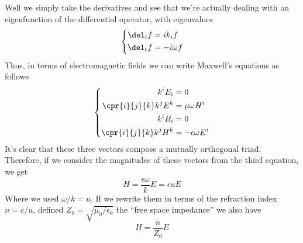 \documentclass[../electromagnetism.tex]{subfiles}
\begin{document}
Well we simply take the derivatives and see that we're actually dealing with an eigenfunction of the differential operator, with eigenvalues
\begin{equation}
	\left\{ \begin{aligned}
		\del_if&= ik_if\\
		\del_tf&= -i\omega f
\end{aligned}\right.
	\label{eq:eigenwave}
\end{equation}
Thus, in terms of electromagnetic fields we can write Maxwell's equations as follows
\begin{equation}
	\left\{ \begin{aligned}
			k^iE_i&= 0\\
			\cpr{i}{j}{k}k^jE^k&= \mu\omega H^i\\
			k^iB_i&= 0\\
			\cpr{i}{j}{k}k^jH^k&= -\epsilon\omega E^i
	\end{aligned}\right.
	\label{eq:eigenmaxwell}
\end{equation}
It's clear that these three vectors compose a mutually orthogonal triad. Therefore, if we consider the magnitudes of these vectors from the third equation, we get
\begin{equation}
	H=\frac{\epsilon\omega}{k}E=\epsilon uE
	\label{eq:HErelwaves}
\end{equation}
Where we used $\omega/k=u$. If we rewrite them in terms of the refraction index $n=c/u$, defined $Z_0=\sqrt{\mu_0/\epsilon_0}$ the ``free space impedance'' we also have
\begin{equation*}
	H=\frac{n}{Z_0}E
\end{equation*}
\end{document}
